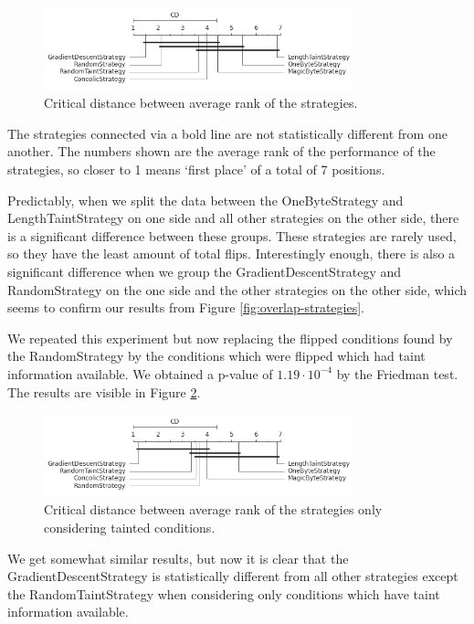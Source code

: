 \begin{figure}[H]
    \centering
    \includegraphics[width=0.8\textwidth]{5_results/graphs_new/cd_strategies.png}  
    \caption{Critical distance between average rank of the strategies.}
    \label{fig:cd-strategies}
\end{figure}

The strategies connected via a bold line are not statistically different from one another. The numbers shown are the average rank of the performance of the strategies, so closer to 1 means `first place' of a total of 7 positions.

Predictably, when we split the data between the OneByteStrategy and LengthTaintStrategy on one side and all other strategies on the other side, there is a significant difference between these groups. These strategies are rarely used, so they have the least amount of total flips. 
Interestingly enough, there is also a significant difference when we group the GradientDescentStrategy and RandomStrategy on the one side and the other strategies on the other side, which seems to confirm our results from Figure \ref{fig:overlap-strategies}.

We repeated this experiment but now replacing the flipped conditions found by the RandomStrategy by the conditions which were flipped which had taint information available. We obtained a p-value of $1.19 \cdot 10^{-4}$ by the Friedman test. The results are visible in Figure \ref{fig:cd-strategies-with-taint}.
\begin{figure}[H]
    \centering
    \includegraphics[width=0.8\textwidth]{5_results/graphs_new/cd_strategies_with_offset.png}  
    \caption{Critical distance between average rank of the strategies only considering tainted conditions.}
    \label{fig:cd-strategies-with-taint}
\end{figure}
We get somewhat similar results, but now it is clear that the GradientDescentStrategy is statistically different from all other strategies except the RandomTaintStrategy when considering only conditions which have taint information available.

